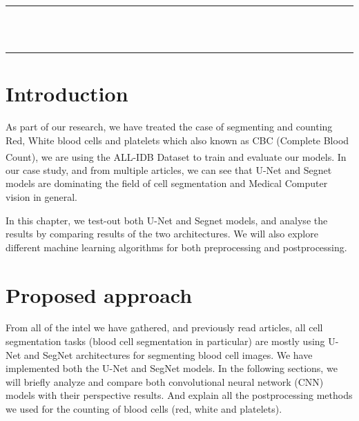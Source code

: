 \thispagestyle{empty}
\vspace*{\fill}
\begin{center}
    {\color{Black} \rule{\linewidth}{1.2mm} }\\
\vspace{0.25in}
{\centering{}}
\vspace{0.35in}\\
    {\color{Black} \rule{\linewidth}{1.2mm} }
\end{center}
\vspace*{\fill}
\setcounter{section}{0}

\newpage

\section{Introduction}
\vspace{0.2in}
\hspace{\parindent}
As part of our research, we have treated the case of segmenting and counting Red, White blood cells and platelets which also known as CBC (Complete Blood Count), we are using the ALL-IDB\textsuperscript{\cite{pm77-2n23-20}} Dataset to train and evaluate our models.
In our case study, and from multiple articles, we can see that U-Net and Segnet models are dominating the field of cell segmentation and Medical Computer vision in general.

In this chapter, we test-out both U-Net and Segnet models, and analyse the results by comparing results of the two architectures.
We will also explore different machine learning algorithms for both preprocessing and postprocessing.

\section{Proposed approach}
\vspace{0.2in}
\hspace{\parindent}
From all of the intel we have gathered, and previously read articles, all cell segmentation tasks (blood cell segmentation in particular) are mostly using U-Net and SegNet architectures for segmenting blood cell images.
We have implemented both the U-Net and SegNet models.
In the following sections, we will briefly analyze and compare both convolutional neural network (CNN) models with their perspective results.
And explain all the postprocessing methods we used for the counting of blood cells (red, white and platelets).

